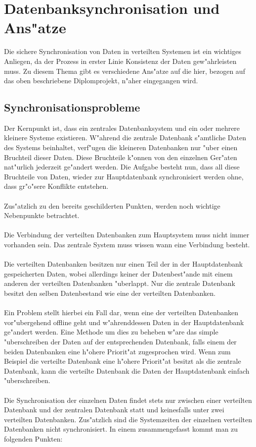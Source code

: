 \documentclass[a4paper,14pt]{scrreprt}
\begin{document}
\section{Datenbanksynchronisation und Ans"atze}
Die sichere Synchronisation von Daten in verteilten Systemen ist ein wichtiges Anliegen, da der Prozess in erster Linie Konsistenz der Daten gew"ahrleisten muss. Zu diesem Thema gibt es verschiedene Ans"atze auf die hier, bezogen auf das oben beschriebene Diplomprojekt, n"aher eingegangen wird.
\subsection{Synchronisationsprobleme}
Der Kernpunkt ist, dass ein zentrales Datenbanksystem und ein oder mehrere kleinere Systeme existieren. W"ahrend die zentrale Datenbank s"amtliche Daten des Systems beinhaltet, verf"ugen die kleineren Datenbanken nur "uber einen Bruchteil dieser Daten. Diese Bruchteile k"onnen von den einzelnen Ger"aten nat"urlich jederzeit ge"andert werden. Die Aufgabe besteht nun, dass all diese Bruchteile von Daten, wieder zur Hauptdatenbank synchronisiert werden ohne, dass gr"o"sere Konflikte entstehen.\\\\Zus"atzlich zu den bereits geschilderten Punkten, werden noch wichtige Nebenpunkte betrachtet.\\\\Die Verbindung der verteilten Datenbanken zum Hauptsystem muss nicht immer vorhanden sein. Das zentrale System muss wissen wann eine Verbindung besteht.\\\\Die verteilten Datenbanken besitzen nur einen Teil der in der Hauptdatenbank gespeicherten Daten, wobei allerdings keiner der Datenbest"ande mit einem anderen der verteilten Datenbanken "uberlappt. Nur die zentrale Datenbank besitzt den selben Datenbestand wie eine der verteilten Datenbanken.\\\\Ein Problem stellt hierbei ein Fall dar, wenn eine der verteilten Datenbanken vor"ubergehend offline geht und w"ahrenddessen Daten in der Hauptdatenbank ge"andert werden. Eine Methode um dies zu beheben w"are das simple "uberschreiben der Daten auf der entsprechenden Datenbank, falls einem der beiden Datenbanken eine h"ohere Priorit"at zugesprochen wird. Wenn zum Beispiel die verteilte Datenbank eine h"ohere Priorit"at besitzt als die zentrale Datenbank, kann die verteilte Datenbank die Daten der Hauptdatenbank einfach "uberschreiben. \\\\ Die Synchronisation der einzelnen Daten findet stets nur zwischen einer verteilten Datenbank und der zentralen Datenbank statt und keinesfalls unter zwei verteilten Datenbanken. Zus"atzlich sind die Systemzeiten der einzelnen verteilten Datenbanken nicht synchronisiert. In einem zusammengefasst kommt man zu folgenden Punkten:
\end{document}
